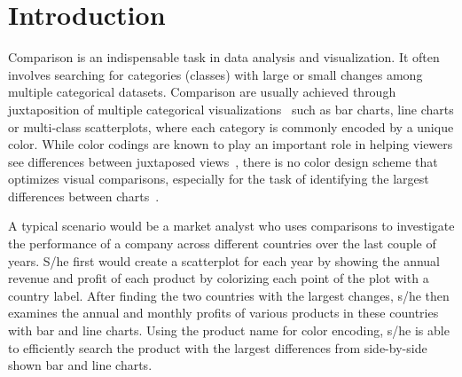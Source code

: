 \section{Introduction}
Comparison is an indispensable task in data analysis and visualization. It often involves searching for categories (classes) with large or small changes among multiple categorical datasets.
Comparison are usually achieved through juxtaposition of multiple categorical visualizations~\cite{Gleicher18,LYi21} such as bar charts, line charts or multi-class scatterplots, where each category is commonly encoded by a unique color.
While color codings are known to play an important role in helping viewers see differences between juxtaposed views~\cite{Tominski08,Albers11,Gleicher18}, there is no color design scheme that optimizes visual comparisons, especially for the task of identifying the largest differences between charts~\cite{Ondov19}. %

A typical scenario would be  a market analyst who uses comparisons to
investigate the performance of a company across different countries over the last couple  of years.
S/he first would create a scatterplot for each year by showing the annual revenue and profit of each product by colorizing each point of the plot with a country label.
After finding the two countries with the largest changes, s/he then examines the annual and monthly profits of various products in these countries with bar and line charts. Using the product name for color encoding, s/he is able to  efficiently search the product with the largest differences from side-by-side shown bar and line charts.


